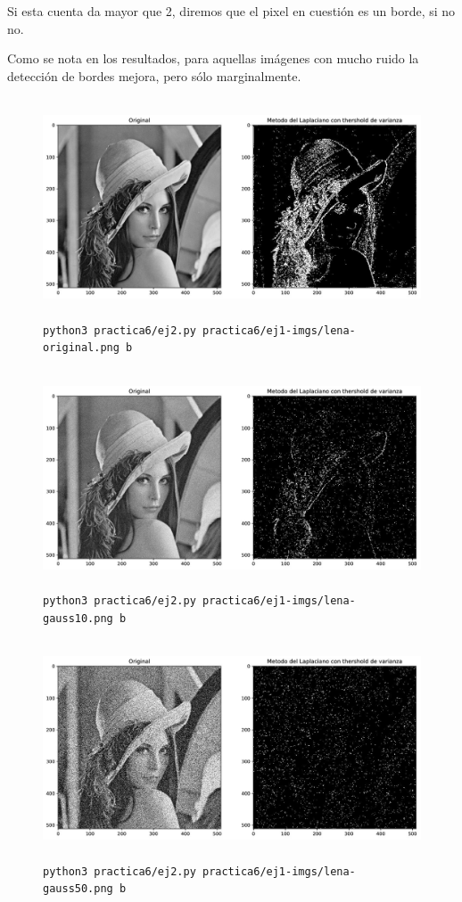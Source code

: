 \documentclass[11pt, spanish]{article}
\begin{document}
Si esta cuenta da mayor que 2, diremos que el pixel en cuestión es un borde, si no no.

Como se nota en los resultados, para aquellas imágenes con mucho ruido la detección de bordes mejora, pero sólo marginalmente.


\begin{figure}[H]
\centering
    \includegraphics[height=6.5cm]{informe-imgs/ej2-b-lena-original.jpg}
    \caption{\texttt{python3 practica6/ej2.py practica6/ej1-imgs/lena-original.png b}}
\end{figure}

\begin{figure}[H]
\centering
    \includegraphics[height=6.5cm]{informe-imgs/ej2-b-lena-gauss10.jpg}
    \caption{\texttt{python3 practica6/ej2.py practica6/ej1-imgs/lena-gauss10.png b}}
\end{figure}

\begin{figure}[H]
\centering
    \includegraphics[height=6.5cm]{informe-imgs/ej2-b-lena-gauss50.jpg}
    \caption{\texttt{python3 practica6/ej2.py practica6/ej1-imgs/lena-gauss50.png b}}
\end{figure}
\end{document}
